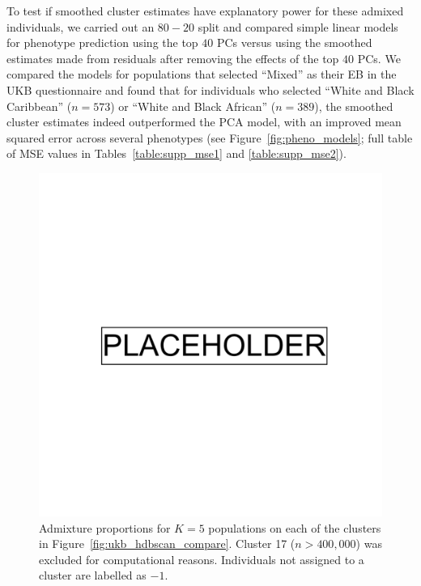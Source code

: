 \clearpage

To test if smoothed cluster estimates have explanatory power for these admixed individuals, we carried out an $80-20$ split and compared simple linear models for phenotype prediction using the top $40$ PCs versus using the smoothed estimates made from residuals after removing the effects of the top $40$ PCs. We compared the models for populations that selected ``Mixed'' as their EB in the UKB questionnaire and found that for individuals who selected ``White and Black Caribbean'' ($n=573$) or ``White and Black African'' ($n=389$), the smoothed cluster estimates indeed outperformed the PCA model, with an improved mean squared error across several phenotypes (see Figure~\ref{fig:pheno_models}; full table of MSE values in Tables~\ref{table:supp_mse1} and \ref{table:supp_mse2}).


\clearpage

\begin{figure}[ht]
  \centering
    \includegraphics[width=0.8\linewidth]{placeholder.png}
    \caption[Admixture proportions for 5 populations]{Admixture proportions for $K=5$ populations on each of the clusters in Figure~\ref{fig:ukb_hdbscan_compare}. Cluster 17 ($n>400,000$) was excluded for computational reasons. Individuals not assigned to a cluster are labelled as $-1$.}
  \label{fig:supp_ukb_admix}
\end{figure}

\clearpage


